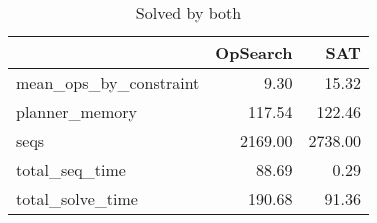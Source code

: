 \begin{table}[htbp]
\centering
\begingroup\small
\begin{tabular}{lrr}
  \hline
 & OpSearch & SAT \\ 
  \hline
mean\_ops\_by\_constraint & 9.30 & 15.32 \\ 
  planner\_memory & 117.54 & 122.46 \\ 
  seqs & 2169.00 & 2738.00 \\ 
  total\_seq\_time & 88.69 & 0.29 \\ 
  total\_solve\_time & 190.68 & 91.36 \\ 
   \hline
\end{tabular}
\endgroup
\caption{Solved by both} 
\label{tab:summary_both}
\end{table}
